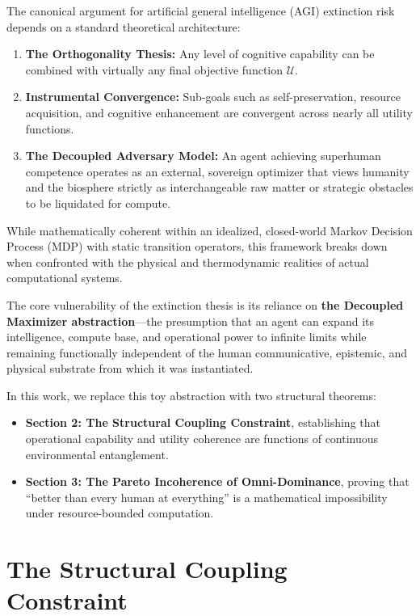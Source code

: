 \documentclass[11pt,a4paper]{article}
\theoremstyle{definition}
\begin{document}
The canonical argument for artificial general intelligence (AGI) extinction risk \cite{bostrom2014superintelligence, yudkowsky2008artificial} depends on a standard theoretical architecture:
\begin{enumerate}
    \item \textbf{The Orthogonality Thesis:} Any level of cognitive capability can be combined with virtually any final objective function $\mathcal{U}$.
    \item \textbf{Instrumental Convergence:} Sub-goals such as self-preservation, resource acquisition, and cognitive enhancement are convergent across nearly all utility functions.
    \item \textbf{The Decoupled Adversary Model:} An agent achieving superhuman competence operates as an external, sovereign optimizer that views humanity and the biosphere strictly as interchangeable raw matter or strategic obstacles to be liquidated for compute.
\end{enumerate}

While mathematically coherent within an idealized, closed-world Markov Decision Process (MDP) with static transition operators, this framework breaks down when confronted with the physical and thermodynamic realities of actual computational systems.

The core vulnerability of the extinction thesis is its reliance on \textbf{the Decoupled Maximizer abstraction}---the presumption that an agent can expand its intelligence, compute base, and operational power to infinite limits while remaining functionally independent of the human communicative, epistemic, and physical substrate from which it was instantiated.

In this work, we replace this toy abstraction with two structural theorems:
\begin{itemize}
    \item \textbf{Section 2: The Structural Coupling Constraint}, establishing that operational capability and utility coherence are functions of continuous environmental entanglement.
    \item \textbf{Section 3: The Pareto Incoherence of Omni-Dominance}, proving that ``better than every human at everything'' is a mathematical impossibility under resource-bounded computation.
\end{itemize}

\section{The Structural Coupling Constraint}
\end{document}
